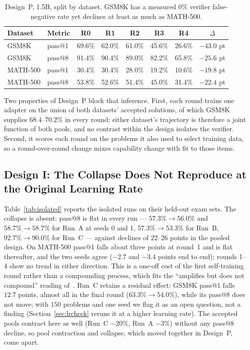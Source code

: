 \documentclass[runningheads]{llncs}
\begin{document}
\begin{table}[t]
\caption{Design~P, 1.5B, split by dataset. GSM8K has a measured $0\%$
verifier false-negative rate yet declines at least as much as MATH-500.}
\label{tab:bydataset}
\centering
\begin{tabular}{llccccc c}
\toprule
Dataset & Metric & R0 & R1 & R2 & R3 & R4 & $\Delta$ \\
\midrule
GSM8K & pass@1 & 69.6\% & 62.0\% & 61.0\% & 45.6\% & 26.6\% & $-43.0$ pt \\
GSM8K & pass@8 & 91.4\% & 90.4\% & 89.0\% & 82.2\% & 65.8\% & $-25.6$ pt \\
MATH-500 & pass@1 & 30.4\% & 30.4\% & 28.0\% & 19.2\% & 10.6\% & $-19.8$ pt \\
MATH-500 & pass@8 & 53.8\% & 52.6\% & 51.4\% & 45.0\% & 31.4\% & $-22.4$ pt \\
\bottomrule
\end{tabular}
\end{table}

Two properties of Design~P block that inference. First, each round trains one
adapter on the union of both datasets' accepted solutions, of which GSM8K
supplies $68.4$--$70.2\%$ in every round; either dataset's trajectory is
therefore a joint function of both pools, and no contrast within the design
isolates the verifier. Second, it scores each round on the problems it also used
to select training data, so a round-over-round change mixes capability change
with fit to those items.

\subsection{Design I: The Collapse Does Not Reproduce at the Original Learning Rate}
\label{sec:isolated}

Table~\ref{tab:isolated} reports the isolated runs on their held-out exam sets.
The collapse is absent: pass@8 is flat in every run --- $57.3\%\to56.0\%$ and
$58.7\%\to58.7\%$ for Run~A at seeds 0 and 1, $57.3\%\to53.3\%$ for Run~B,
$92.7\%\to90.0\%$ for Run~C --- against declines of $22$--$26$ points in the
pooled design. On MATH-500 pass@1 falls about three points at round~1 and is flat
thereafter, and the two seeds agree ($-2.7$ and $-3.4$ points end to end);
rounds 1--4 show no trend in either direction. This is a one-off cost of the
first self-training round rather than a compounding process, which fits the
``amplifies but does not compound'' reading of~\cite{ref_teacherfree}. Run~C
retains a residual effect: GSM8K pass@1 falls $12.7$ points, almost all in the
final round ($63.3\%\to54.0\%$), while its pass@8 does not move; with $150$
problems and one seed we flag it as an open question, not a finding
(Section~\ref{sec:lrcheck} reruns it at a higher learning rate). The accepted
pools contract here as well (Run~C $-20\%$, Run~A $-3\%$) without any pass@8
decline, so pool contraction and collapse, which moved together in Design~P,
come apart.
\end{document}
